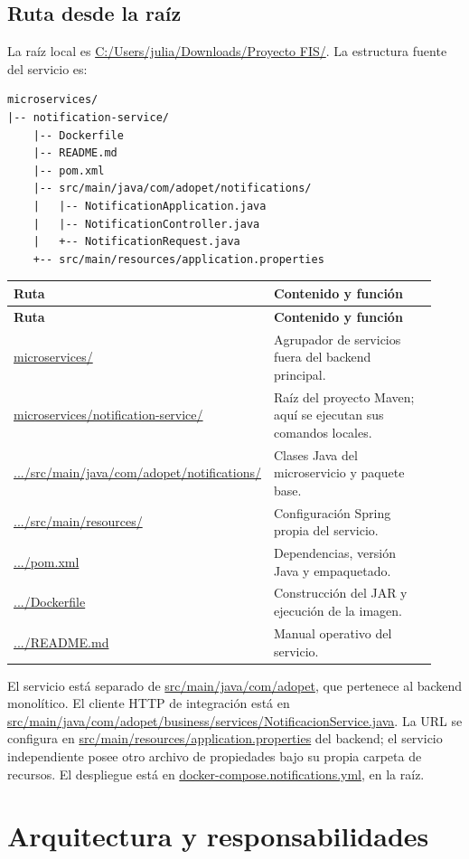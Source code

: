 \documentclass[11pt,a4paper]{article}
\newcommand{\pathcode}[1]{\small\url{#1}}\newcommand{\envvar}[1]{\small\url{#1}}
\begin{document}
\subsection{Ruta desde la raíz}
La raíz local es \pathcode{C:/Users/julia/Downloads/Proyecto FIS/}. La estructura fuente del servicio es:
\begin{lstlisting}
microservices/
|-- notification-service/
    |-- Dockerfile
    |-- README.md
    |-- pom.xml
    |-- src/main/java/com/adopet/notifications/
    |   |-- NotificationApplication.java
    |   |-- NotificationController.java
    |   +-- NotificationRequest.java
    +-- src/main/resources/application.properties
\end{lstlisting}
\begin{longtable}{p{0.40\linewidth}p{0.53\linewidth}}
\toprule\textbf{Ruta} & \textbf{Contenido y función}\\\midrule\endfirsthead\toprule\textbf{Ruta} & \textbf{Contenido y función}\\\midrule\endhead
\pathcode{microservices/} & Agrupador de servicios fuera del backend principal.\\
\pathcode{microservices/notification-service/} & Raíz del proyecto Maven; aquí se ejecutan sus comandos locales.\\
\pathcode{.../src/main/java/com/adopet/notifications/} & Clases Java del microservicio y paquete base.\\
\pathcode{.../src/main/resources/} & Configuración Spring propia del servicio.\\
\pathcode{.../pom.xml} & Dependencias, versión Java y empaquetado.\\
\pathcode{.../Dockerfile} & Construcción del JAR y ejecución de la imagen.\\
\pathcode{.../README.md} & Manual operativo del servicio.\\
\bottomrule\end{longtable}

El servicio está separado de \pathcode{src/main/java/com/adopet}, que pertenece al backend monolítico. El cliente HTTP de integración está en \pathcode{src/main/java/com/adopet/business/services/NotificacionService.java}. La URL se configura en \pathcode{src/main/resources/application.properties} del backend; el servicio independiente posee otro archivo de propiedades bajo su propia carpeta de recursos. El despliegue está en \pathcode{docker-compose.notifications.yml}, en la raíz.

\section{Arquitectura y responsabilidades}
\end{document}
